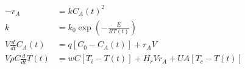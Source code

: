\begin{equation}
  \begin{aligned}
    -r_A                      & = kC_A(t)^2
    \\
    k                         & = k_0 \exp(-\frac{E}{RT(t)})
    \\
    V\frac{d}{dt}C_A(t)       & = q [C_0 - C_A(t)] + r_A V
    \\
    V \rho C \frac{d}{dt}T(t) & = w C [T_i - T(t)] + H_r V r_A + U A [T_c - T(t)]
  \end{aligned}
  \label{eq:CSTR_2ndorder01_2}
\end{equation}